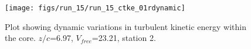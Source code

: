 \begin{figure}[H]
\centering
\texttt{[image: figs/run\_15/run\_15\_ctke\_01rdynamic]}
\caption{Plot showing dynamic variations in turbulent kinetic energy within the core. $z/c$=6.97, $V_{free}$=23.21, station 2.}
\label{fig:run_15_ctke_01rdynamic}
\end{figure}


